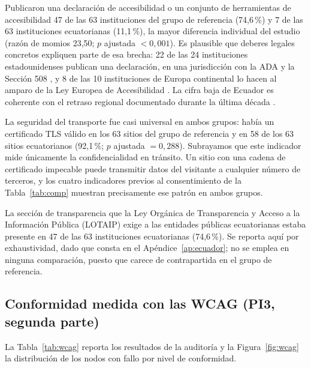 \documentclass[pdflatex,sn-basic,Numbered,iicol]{sn-jnl}
\theoremstyle{thmstyleone}
\theoremstyle{thmstyletwo}
\theoremstyle{thmstylethree}
\begin{document}
Publicaron una declaraci\'on de accesibilidad o un conjunto de herramientas de accesibilidad 47 de las 63 instituciones del grupo de referencia (74,6\,\%) y 7 de las 63 instituciones ecuatorianas (11,1\,\%), la mayor diferencia individual del estudio (raz\'on de momios 23,50; $p$ ajustada $<0{,}001$). Es plausible que deberes legales concretos expliquen parte de esa brecha: 22 de las 24 instituciones estadounidenses publican una declaraci\'on, en una jurisdicci\'on con la ADA y la Secci\'on 508 \citep{ada1990,section508}, y 8 de las 10 instituciones de Europa continental lo hacen al amparo de la Ley Europea de Accesibilidad \citep{eaa2019}. La cifra baja de Ecuador es coherente con el retraso regional documentado durante la \'ultima d\'ecada \citep{campoverdemolina2023accessibility,acostavargas2020dataset}.

La seguridad del transporte fue casi universal en ambos grupos: hab\'ia un certificado TLS v\'alido en los 63 sitios del grupo de referencia y en 58 de los 63 sitios ecuatorianos (92,1\,\%; $p$ ajustada $=0{,}288$). Subrayamos que este indicador mide \'unicamente la confidencialidad en tr\'ansito. Un sitio con una cadena de certificado impecable puede transmitir datos del visitante a cualquier n\'umero de terceros, y los cuatro indicadores previos al consentimiento de la Tabla~\ref{tab:comp} muestran precisamente ese patr\'on en ambos grupos.

La secci\'on de transparencia que la Ley Org\'anica de Transparencia y Acceso a la Informaci\'on P\'ublica (LOTAIP) exige a las entidades p\'ublicas ecuatorianas estaba presente en 47 de las 63 instituciones ecuatorianas (74,6\,\%). Se reporta aqu\'i por exhaustividad, dado que consta en el Ap\'endice~\ref{ap:ecuador}; no se emplea en ninguna comparaci\'on, puesto que carece de contrapartida en el grupo de referencia.

\subsection{Conformidad medida con las WCAG (PI3, segunda parte)}\label{sec:results-wcag}

La Tabla~\ref{tab:wcag} reporta los resultados de la auditor\'ia y la Figura~\ref{fig:wcag} la distribuci\'on de los nodos con fallo por nivel de conformidad.
\end{document}
